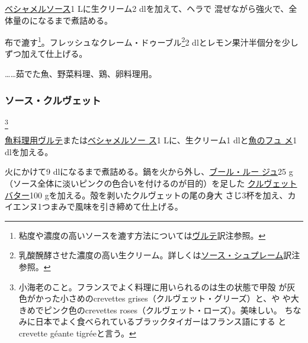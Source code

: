 \begin{recette}

\protect\hyperlink{sauce-bechamel}{ベシャメルソース}1 Lに生クリーム2
dlを加えて、ヘラで
混ぜながら強火で、全体量の\troisquarts{}になるまで煮詰める。

布で漉す\footnote{粘度や濃度の高いソースを漉す方法については\protect\hyperlink{veloute}{ヴルテ}訳注参照。}。フレッシュなクレーム・ドゥーブル\footnote{乳酸醗酵させた濃度の高い生クリーム。詳しくは\protect\hyperlink{sauce-supreme}{ソース・シュプレーム}訳注参照。}2\undemi{}
dlとレモン果汁半個分を少しずつ加えて仕上げる。

\ldots{}\ldots{}茹でた魚、野菜料理、鶏、卵料理用。

\maeaki

\hypertarget{sauce-aux-crevettes}{%
\subsubsection{ソース・クルヴェット}\label{sauce-aux-crevettes}}

\footnote{小海老のこと。フランスでよく料理に用いられるのは生の状態で甲殻
  が灰色がかった小さめのcrevettes grises（クルヴェット・グリーズ）と、や
  や大きめでピンク色のcrevettes
  roses（クルヴェット・ローズ）。美味しい。
  ちなみに日本でよく食べられているブラックタイガーはフランス語にする
  とcrevette géante tigréeと言う。}


\protect\hyperlink{veloute-de-poisson}{魚料理用ヴルテ}または\protect\hyperlink{sauce-bechamel}{ベシャメルソー
ス}1 Lに、生クリーム1\undemi{}
dlと\protect\hyperlink{fumet-de-poisson}{魚のフュ メ}1\undemi{}
dlを加える。

火にかけて9
dlになるまで煮詰める。鍋を火から外し、\protect\hyperlink{}{ブール・ルー
ジュ}25 g（ソース全体に淡いピンクの色合いを付けるのが目的）を足した
\protect\hyperlink{}{クルヴェットバター}100
gを加える。殻を剥いたクルヴェットの尾の身大
さじ3杯を加え、カイエンヌ1つまみで風味を引き締めて仕上げる。


\end{recette}
